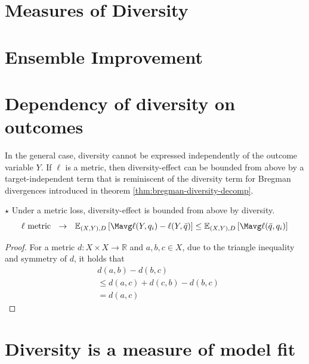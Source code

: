 \documentclass[
    a4paper, %
	fontsize=10pt, %
	twoside=false, %
]{kaobook}
\begin{document}
\begin{titlepage}
\section{Measures of Diversity}
\label{sec:diversity-measures}





\section{Ensemble Improvement}



\section{Dependency of diversity on outcomes}


In the general case, diversity cannot be expressed independently of the outcome variable $Y$. If $\ell$ is a metric, then diversity-effect can be bounded from above by a target-independent term that is reminiscent of the diversity term for Bregman divergences introduced in theorem \ref{thm:bregman-diversity-decomp}.
\begin{lemma} $\star$ Under a metric loss, diversity-effect is bounded from above by diversity. 
$$
\text{$\ell$ metric}  ~~\rightarrow~~ \mathbb{E}_{(X,Y), D}\left[ \Mavg \ell(Y, q_{i}) - \ell(Y, \bar{q}) \right] 
\leq \mathbb{E}_{(X,Y),D}\left[ \Mavg \ell(\bar{q}, q_{i}) \right] 
$$
\end{lemma}
\begin{proof}
For a metric $d:X \times X \to \mathbb{R}$ and $a,b,c \in X$, due to the triangle inequality and symmetry of $d$, it holds that
\begin{align*}
& d(a,b) - d(b,c)  \\
& \leq d(a,c) + d(c,b) - d(b,c) \\
&= d(a,c)
\end{align*}
\end{proof}

\section{Diversity is a measure of model fit}



\end{titlepage}
\end{document}
